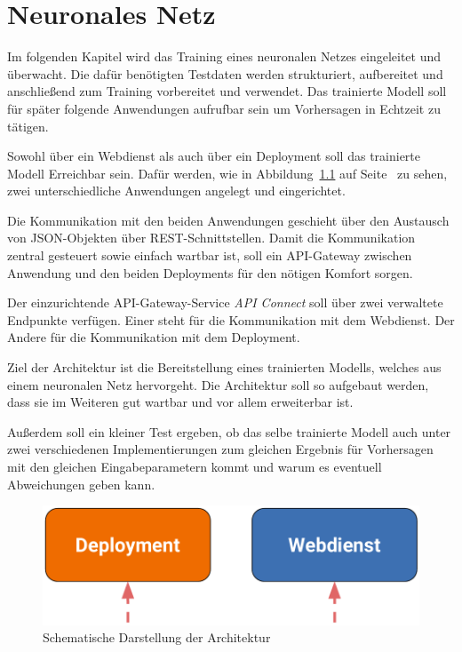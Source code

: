 \chapter{Neuronales Netz}
\label{ch:neuronalesNetz}
Im folgenden Kapitel wird das Training eines neuronalen Netzes eingeleitet und überwacht. Die dafür benötigten Testdaten
werden strukturiert, aufbereitet und anschließend zum Training vorbereitet und verwendet. Das trainierte Modell soll für
später folgende Anwendungen aufrufbar sein um Vorhersagen in Echtzeit zu tätigen.

Sowohl über ein Webdienst als auch über ein Deployment soll das trainierte Modell Erreichbar sein. Dafür werden, wie in
Abbildung~\ref{fig:schematische_architektur} auf Seite~\pageref{fig:schematische_architektur} zu sehen, zwei
unterschiedliche Anwendungen angelegt und eingerichtet.

Die Kommunikation mit den beiden Anwendungen geschieht über den Austausch von JSON-Objekten über REST-Schnittstellen.
Damit die Kommunikation zentral gesteuert sowie einfach wartbar ist, soll ein API-Gateway zwischen Anwendung und den
beiden Deployments für den nötigen Komfort sorgen.

Der einzurichtende API-Gateway-Service \textit{API Connect} soll über zwei verwaltete Endpunkte verfügen. Einer steht
für die Kommunikation mit dem Webdienst. Der Andere für die Kommunikation mit dem Deployment.

Ziel der Architektur ist die Bereitstellung eines trainierten Modells, welches aus einem neuronalen Netz hervorgeht. Die
Architektur soll so aufgebaut werden, dass sie im Weiteren gut wartbar und vor allem erweiterbar ist.

Außerdem soll ein kleiner Test ergeben, ob das selbe trainierte Modell auch unter zwei verschiedenen Implementierungen
zum gleichen Ergebnis für Vorhersagen mit den gleichen Eingabeparametern kommt und warum es eventuell Abweichungen geben
kann.

\begin{figure}[h]
    \centering
    \includegraphics[scale=0.5]{images/kapitel_3/architektur_schematisch.pdf}
    \caption{Schematische Darstellung der Architektur}
    \label{fig:schematische_architektur}
\end{figure}